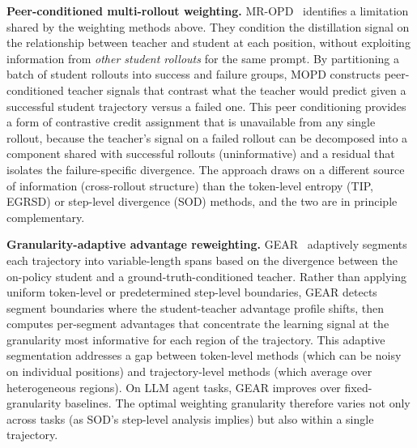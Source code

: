 \documentclass{article} %
\begin{document}
\textbf{Peer-conditioned multi-rollout weighting.} MR-OPD~\citep{2605.12652} identifies a limitation shared by the weighting methods above. They condition the distillation signal on the relationship between teacher and student at each position, without exploiting information from \emph{other student rollouts} for the same prompt. By partitioning a batch of student rollouts into success and failure groups, MOPD constructs peer-conditioned teacher signals that contrast what the teacher would predict given a successful student trajectory versus a failed one. This peer conditioning provides a form of contrastive credit assignment that is unavailable from any single rollout, because the teacher's signal on a failed rollout can be decomposed into a component shared with successful rollouts (uninformative) and a residual that isolates the failure-specific divergence. The approach draws on a different source of information (cross-rollout structure) than the token-level entropy (TIP, EGRSD) or step-level divergence (SOD) methods, and the two are in principle complementary.

\textbf{Granularity-adaptive advantage reweighting.} GEAR~\citep{2605.11853} adaptively segments each trajectory into variable-length spans based on the divergence between the on-policy student and a ground-truth-conditioned teacher. Rather than applying uniform token-level or predetermined step-level boundaries, GEAR detects segment boundaries where the student-teacher advantage profile shifts, then computes per-segment advantages that concentrate the learning signal at the granularity most informative for each region of the trajectory. This adaptive segmentation addresses a gap between token-level methods (which can be noisy on individual positions) and trajectory-level methods (which average over heterogeneous regions). On LLM agent tasks, GEAR improves over fixed-granularity baselines. The optimal weighting granularity therefore varies not only across tasks (as SOD's step-level analysis implies) but also within a single trajectory.
\end{document}
